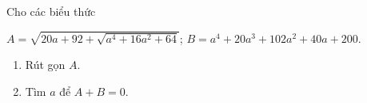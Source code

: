     \begin{bt}%
    	Cho các biểu thức 
    	
    	$A= \sqrt{20a + 92 + \sqrt{a^4 + 16a^2 + 64}}$;
    	$B= a^4 + 20a^3+102a^2+40a+200$.
    	\begin{enumerate}
    		\item Rút gọn $A$.
    		\item Tìm $a$ để $A+B=0$.
    	\end{enumerate}
    \end{bt} 

